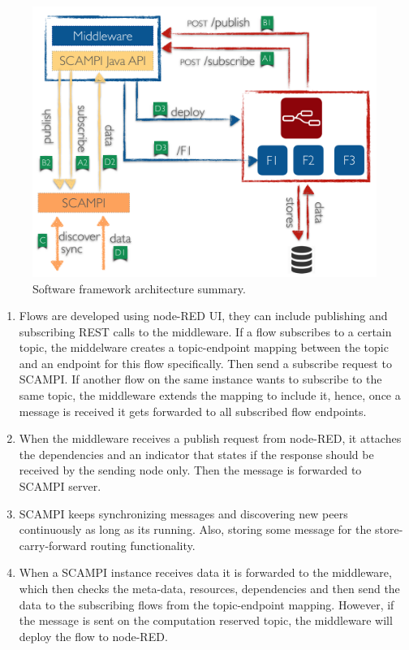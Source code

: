 \begin{figure}[H]
	\centering
	\includegraphics[scale=0.5]{images/design.png}
	\caption{Software framework architecture summary. }
	\label{fig:design}
\end{figure}

\begin{enumerate}[label=(\Alph*)]
 
 \item Flows are developed using node-RED UI, they can include publishing and subscribing REST calls to the middleware. If a flow subscribes to a certain topic, the middelware creates  a topic-endpoint mapping between the topic and an endpoint for this flow specifically. Then send a subscribe request to SCAMPI. If another flow on the same instance wants to subscribe to the same topic, the middleware extends the mapping to include it, hence, once a message is received it gets forwarded to all subscribed flow endpoints. 

 \item When the middleware receives a publish request from node-RED, it attaches the dependencies and an indicator that states if the response should be received by the sending node only. Then the message is forwarded to SCAMPI server.

 \item SCAMPI keeps synchronizing messages and discovering new peers continuously as long as its running. Also, storing some message for the store-carry-forward routing functionality.

 \item When a SCAMPI instance receives data it is forwarded to the middleware, which then checks the meta-data, resources, dependencies and then send the data to the subscribing flows from the topic-endpoint mapping. However, if the message is sent on the computation reserved topic, the middleware will deploy the flow to node-RED.

\end{enumerate}

